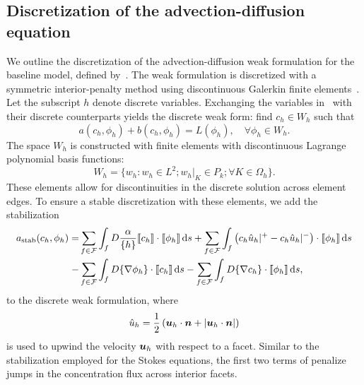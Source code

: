 \documentclass{WileyMSP-template}
\begin{document}
\subsection{Discretization of the advection-diffusion equation}
We outline the discretization of the advection-diffusion weak formulation
for the baseline model, defined
by~.
The weak formulation is discretized with a symmetric interior-penalty method using
discontinuous Galerkin finite elements~\cite{Arnold1982AnElements}.
Let the subscript $h$ denote discrete variables. Exchanging the
variables in~ with their discrete
counterparts yields the discrete weak form: find $c_h\in W_h$ such that
\begin{equation*}
    a(c_h, \phi_h) + b(c_h, \phi_h) = L(\phi_h), \quad\forall\phi_h\in W_h.
\end{equation*}
The space $W_h$ is constructed with finite elements with
discontinuous Lagrange polynomial basis functions:
\begin{equation}
    W_h = \Big\{w_h : w_h\in L^2;  w_h\vert_K\in P_k; \forall K\in\Omega_h\Big\}.
\end{equation}
These elements allow for discontinuities in the discrete solution across element edges.
To ensure a stable discretization with these elements, we add the stabilization
\begin{equation}
    \begin{aligned}
        a_{\mathrm{stab}}(c_h, \phi_h)
        = &\sum_{f\in \mathcal{F}}\int_f{D\frac{\alpha}{\{h\}}\llbracket c_h\rrbracket\cdot\llbracket\phi_h\rrbracket}\,\mathrm ds
        +\sum_{f\in \mathcal{F}}\int_f{\left({c_h \hat{u}_h}|^+ - {c_h \hat{u}_h}|^-\right)\cdot\llbracket\phi_h\rrbracket}\,\mathrm ds  \\
         -&\sum_{f\in \mathcal{F}}\int_f{D\{\nabla\phi_h\}\cdot\llbracket c_h\rrbracket}\,\mathrm ds
         -\sum_{f\in \mathcal{F}}\int_f{D\{\nabla c_h\}\cdot\llbracket\phi_h\rrbracket}\,\mathrm ds,
    \end{aligned}\label{eq:SIP_stabilization}
\end{equation}
to the discrete weak formulation, where
\begin{equation*}
    \hat{u}_h = \frac{1}{2}\left(\bm{u}_h\cdot\bm{n} + \vert\bm{u}_h\cdot\bm{n}\vert\right)
\end{equation*}
is used to upwind the velocity $\bm{u}_h$ with respect to a
facet. Similar to the stabilization employed for the Stokes equations, the first two terms
of  penalize jumps in the concentration flux across interior facets.
\end{document}
